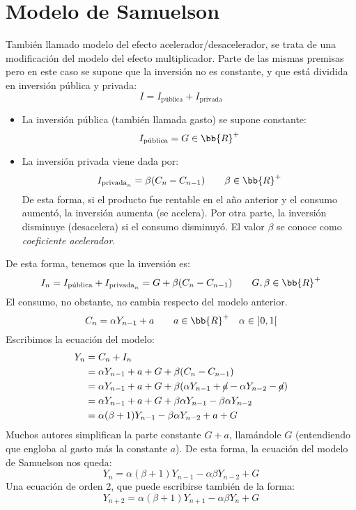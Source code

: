 \section{Modelo de Samuelson}
También llamado modelo del efecto acelerador/desacelerador, se trata de una modificación del modelo del efecto multiplicador. Parte de las mismas premisas pero en este caso se supone que la inversión no es constante, y que está dividida en inversión pública y privada:
\begin{equation*}
    I = I_{\text{pública}} + I_{\text{privada}}
\end{equation*}
\begin{itemize}
    \item La inversión pública (también llamada gasto) se supone constante:
    \begin{equation*}
        I_{\text{pública}} = G\in \bb{R}^+
    \end{equation*}
    \item La inversión privada viene dada por:
    \begin{equation*}
        I_{\text{privada}_n} = \beta (C_n - C_{n-1}) \qquad \beta \in \bb{R}^+
    \end{equation*}
    De esta forma, si el producto fue rentable en el año anterior y el consumo aumentó, la inversión aumenta (se acelera). Por otra parte, la inversión disminuye (desacelera) si el consumo disminuyó. El valor $\beta$ se conoce como \emph{coeficiente acelerador}.
\end{itemize}
De esta forma, tenemos que la inversión es:
\begin{equation*}
    I_n = I_{\text{pública}} + I_{\text{privada}_n} =  G + \beta(C_n - C_{n-1}) \qquad G,\beta \in \bb{R}^+
\end{equation*}
El consumo, no obstante, no cambia respecto del modelo anterior.
\begin{equation*}
    C_n = \alpha Y_{n-1} + a \qquad a\in \bb{R}^+ \quad \alpha \in~]0,1[
\end{equation*}
Escribimos la ecuación del modelo:
\begin{align*}
    Y_n &= C_n + I_n \\
    &= \alpha Y_{n-1} + a + G + \beta (C_n - C_{n-1}) \\
    &= \alpha Y_{n-1} + a + G + \beta (\alpha Y_{n-1} + \cancel{a} - \alpha Y_{n-2} - \cancel{a}) \\
    &= \alpha Y_{n-1} + a + G + \beta\alpha Y_{n-1} - \beta \alpha Y_{n-2} \\
    &= \alpha (\beta + 1) Y_{n-1}- \beta\alpha Y_{n-2} + a + G
\end{align*}
Muchos autores simplifican la parte constante $G + a$, llamándole $G$ (entendiendo que engloba al gasto más la constante $a$). De esta forma, la ecuación del modelo de Samuelson nos queda:
\begin{equation}\label{eq:samuelson}
    Y_n = \alpha(\beta + 1) Y_{n-1} - \alpha\beta Y_{n-2} + G
\end{equation}
Una ecuación de orden 2, que puede escribirse también de la forma:
\begin{equation*}
    Y_{n+2} = \alpha(\beta + 1) Y_{n+1} - \alpha\beta Y_{n} + G
\end{equation*}

